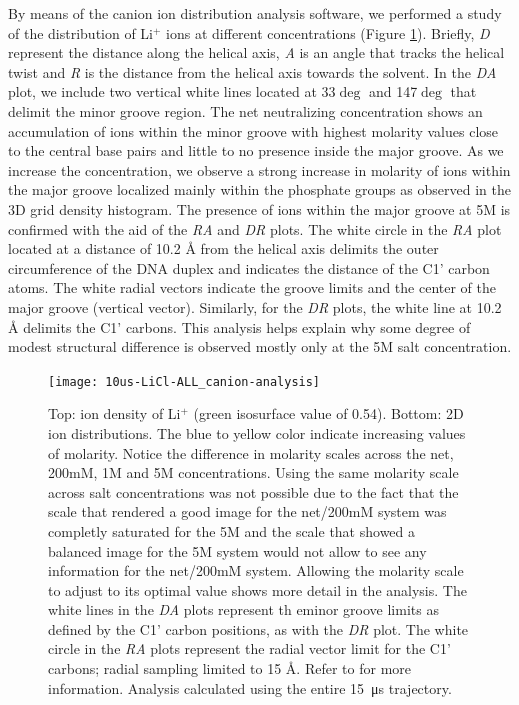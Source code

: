 \documentclass[9pt,lessons]{livecoms}
\begin{document}
By means of the canion ion distribution analysis
software\cite{Lavery2014}, we performed a study of the distribution of
Li$^{+}$ ions at different concentrations (Figure
\ref{10us-LiCl-ALL_canion-analysis}). Briefly, \emph{D} represent the
distance along the helical axis, \emph{A} is an angle that tracks the
helical twist and \emph{R} is the distance from the helical axis towards the solvent. In the \emph{DA} plot, we include two vertical white lines located at 33$\deg$ and 147$\deg$ that delimit the
minor groove region. The net neutralizing concentration shows an accumulation of
ions within the minor groove with highest molarity values close to the central
base pairs and little to no presence inside the major groove. As we
increase the concentration, we observe a strong increase in molarity of ions within the major groove localized mainly within the phosphate groups as observed in the 3D grid density histogram. The
presence of ions within the major groove at 5M is confirmed with the aid of the \emph{RA} and \emph{DR} plots. The white circle in the \emph{RA} plot located at a distance of 10.2 Å from the helical
axis delimits the outer circumference of the DNA duplex and indicates the distance of the C1' carbon atoms. The white radial vectors indicate the groove limits and the center of the major groove
(vertical vector). Similarly, for the \emph{DR} plots, the white line at 10.2 Å
delimits the C1' carbons. This analysis helps
explain why some degree of modest structural difference is observed
mostly only at the 5M salt concentration.

\begin{figure}[]
\centering
\texttt{[image: 10us-LiCl-ALL\_canion-analysis]}
\caption{Top: ion density of Li$^{+}$ (green isosurface value of 0.54). Bottom: 2D ion distributions. The blue to yellow color indicate increasing values of molarity. Notice the difference in molarity
  scales across the net, 200mM, 1M and 5M concentrations. Using the same molarity scale across salt
  concentrations was not possible due to the fact that the scale that rendered a good image for the net/200mM system was completly saturated for the 5M and the scale that showed a balanced image for
  the 5M system would not allow to see any information for the net/200mM system. Allowing the molarity scale to adjust to its optimal value shows more detail in the analysis. The white lines in the \emph{DA}
  plots represent th eminor groove limits as defined by the C1' carbon positions, as with the \emph{DR} plot. The white circle in the \emph{RA} plots represent the radial vector limit for the C1'
  carbons; radial sampling limited to 15 Å. Refer to \cite{Lavery2014} for more information. Analysis calculated using the entire \SI{15}{\micro\second} trajectory.}
\label{10us-LiCl-ALL_canion-analysis}
\end{figure}
\end{document}

